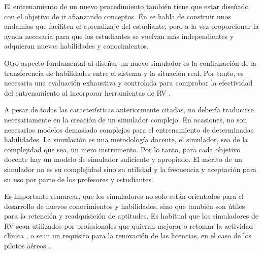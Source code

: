 El entrenamiento de un nuevo procedimiento también tiene que estar diseñado con el objetivo de ir afianzando conceptos. En \cite{olson2014jerome} se habla de construir unos andamios que faciliten el aprendizaje del estudiante, pero a la vez proporcionar la ayuda necesaria para que los estudiantes se vuelvan más independientes y adquieran nuevas habilidades y conocimientos.



Otro aspecto fundamental al diseñar un nuevo simulador es la confirmación de la transferencia de habilidades entre el sistema y la situación real. Por tanto, es necesaria una evaluación exhaustiva y controlada para comprobar la efectividad del entrenamiento al incorporar herramientas de \ac{RV} \cite{AIM2016224}.

A pesar de todas las características anteriormente citadas, no debería   traducirse necesariamente en la creación de un simulador complejo. En ocasiones, no son necesarios modelos demasiado  complejos para el entrenamiento de determinadas habilidades. La simulación es una metodología docente, el simulador, sea de la complejidad que sea, un mero instrumento. Por lo tanto, para cada objetivo docente hay un modelo de simulador suficiente y apropiado. El mérito de un simulador no es su complejidad sino su utilidad y la frecuencia y aceptación para su uso por parte de los profesores y estudiantes.

Es importante remarcar, que los simuladores no solo están orientados para el desarrollo de nuevos conocimientos y habilidades, sino que también son útiles para la retención y readquisición de aptitudes. Es habitual que los simuladores de \ac{RV} sean utilizados por profesionales que quieran mejorar o retomar la actividad clínica \cite{Atesok}, o sean un requisito para la renovación de las licencias, en el caso de los pilotos aéreos \cite{normativa}. 

